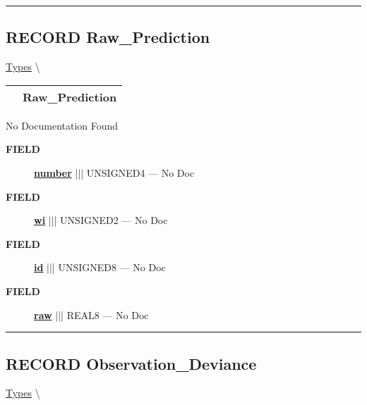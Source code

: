 \rule{\linewidth}{0.5pt}
\subsection*{\textsf{\colorbox{headtoc}{\color{white} RECORD}
Raw\_Prediction}}

\hypertarget{ecldoc:logisticregression.types.raw_prediction}{}
\hspace{0pt} \hyperlink{ecldoc:LogisticRegression.Types}{Types} \textbackslash 

{\renewcommand{\arraystretch}{1.5}
\begin{tabularx}{\textwidth}{|>{\raggedright\arraybackslash}l|X|}
\hline
\hspace{0pt}\mytexttt{\color{red} } & \textbf{Raw\_Prediction} \\
\hline
\end{tabularx}
}

\par





No Documentation Found







\par
\begin{description}
\item [\colorbox{tagtype}{\color{white} \textbf{\textsf{FIELD}}}] \textbf{\underline{number}} ||| UNSIGNED4 --- No Doc
\item [\colorbox{tagtype}{\color{white} \textbf{\textsf{FIELD}}}] \textbf{\underline{wi}} ||| UNSIGNED2 --- No Doc
\item [\colorbox{tagtype}{\color{white} \textbf{\textsf{FIELD}}}] \textbf{\underline{id}} ||| UNSIGNED8 --- No Doc
\item [\colorbox{tagtype}{\color{white} \textbf{\textsf{FIELD}}}] \textbf{\underline{raw}} ||| REAL8 --- No Doc
\end{description}





\rule{\linewidth}{0.5pt}
\subsection*{\textsf{\colorbox{headtoc}{\color{white} RECORD}
Observation\_Deviance}}

\hypertarget{ecldoc:logisticregression.types.observation_deviance}{}
\hspace{0pt} \hyperlink{ecldoc:LogisticRegression.Types}{Types} \textbackslash 

